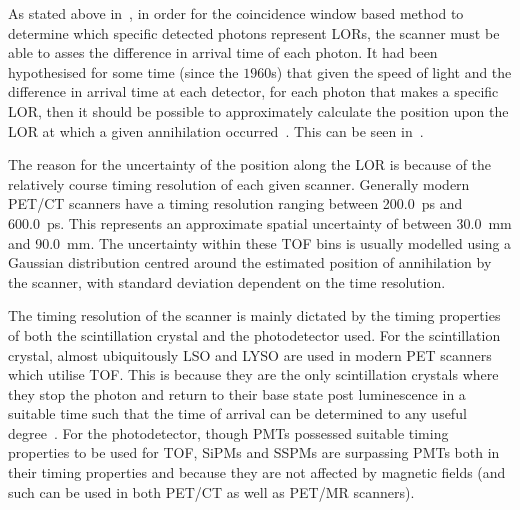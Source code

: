                 As stated above in~, in order for the coincidence window based method to determine which specific detected photons represent \glspl{LOR}, the scanner must be able to asses the difference in arrival time of each photon. %
                It had been hypothesised for some time (since the $1960$s) that given the speed of light and the difference in arrival time at each detector, for each photon that makes a specific \gls{LOR}, then it should be possible to approximately calculate the position upon the \gls{LOR} at which a given annihilation occurred~\parencite{Surti2015, TOFPhotodetectorsBib}. %
                This can be seen in~.
                
                The reason for the uncertainty of the position along the \gls{LOR} is because of the relatively course timing resolution of each given scanner. Generally modern \gls{PET}/\gls{CT} scanners have a timing resolution ranging between \SI{200.0}{\pico\second} and \SI{600.0}{\pico\second}. This represents an approximate spatial uncertainty of between \SI{30.0}{\milli\metre} and \SI{90.0}{\milli\metre}. %
                The uncertainty within these \gls{TOF} bins is usually modelled using a Gaussian distribution centred around the estimated position of annihilation by the scanner, with standard deviation dependent on the time resolution.
                
                The timing resolution of the scanner is mainly dictated by the timing properties of both the scintillation crystal and the photodetector used. For the scintillation crystal, almost ubiquitously \gls{LSO} and \gls{LYSO} are used in modern \gls{PET} scanners which utilise \gls{TOF}. This is because they are the only scintillation crystals where they stop the photon and return to their base state post luminescence in a suitable time such that the time of arrival can be determined to any useful degree~\parencite{TOFLSOBib}. For the photodetector, though \glspl{PMT} possessed suitable timing properties to be used for \gls{TOF}, \glspl{SiPM} and \glspl{SSPM} are surpassing \glspl{PMT} both in their timing properties and because they are not affected by magnetic fields (and such can be used in both \gls{PET}/\gls{CT} as well as \gls{PET}/\gls{MR} scanners).
                
